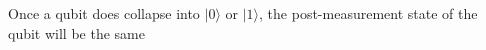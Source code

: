 \documentclass[preview]{standalone}
\begin{document}
\begin{center}
Once a qubit does collapse into $| 0 \rangle$ or $| 1 \rangle$, the post-measurement state of the qubit will be the same
\end{center}
\end{document}
